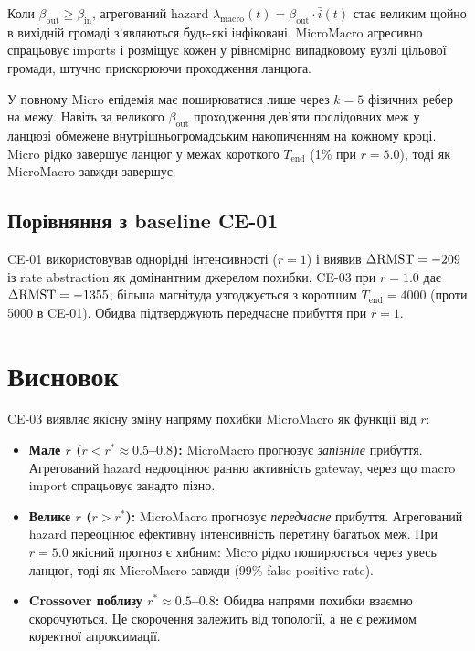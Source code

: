 \documentclass[11pt,a4paper]{article}
\begin{document}
Коли $\beta_{\text{out}} \ge \beta_{\text{in}}$, агрегований hazard
$\lambda_{\text{macro}}(t) = \beta_{\text{out}} \cdot \bar{i}(t)$ стає
великим щойно в вихідній громаді з'являються будь-які інфіковані.  MicroMacro
агресивно спрацьовує imports і розміщує кожен у рівномірно випадковому вузлі
цільової громади, штучно прискорюючи проходження ланцюга.

У повному Micro епідемія має поширюватися лише через $k=5$ фізичних ребер
на межу.  Навіть за великого $\beta_{\text{out}}$ проходження дев'яти
послідовних меж у ланцюзі обмежене внутрішньогромадським накопиченням
на кожному кроці.  Micro рідко завершує ланцюг у межах короткого $T_{\text{end}}$
(1\% при $r=5.0$), тоді як MicroMacro завжди завершує.

\subsection{Порівняння з baseline CE-01}

CE-01 використовував однорідні інтенсивності ($r=1$) і виявив $\Delta\mathrm{RMST} = -209$ із
rate abstraction як домінантним джерелом похибки.  CE-03 при $r=1.0$ дає
$\Delta\mathrm{RMST} = -1355$; більша магнітуда узгоджується з коротшим
$T_{\text{end}} = 4000$ (проти 5000 в CE-01).  Обидва підтверджують передчасне
прибуття при $r=1$.

\section{Висновок}

CE-03 виявляє якісну зміну напряму похибки MicroMacro як функції
від $r$:

\begin{itemize}
  \item \textbf{Мале $r$ ($r < r^* \approx 0.5$--$0.8$):}
        MicroMacro прогнозує \emph{запізніле} прибуття.  Агрегований hazard
        недооцінює ранню активність gateway, через що macro import спрацьовує занадто пізно.
  \item \textbf{Велике $r$ ($r > r^*$):}
        MicroMacro прогнозує \emph{передчасне} прибуття.  Агрегований hazard
        переоцінює ефективну інтенсивність перетину багатьох меж.
        При $r=5.0$ якісний прогноз є хибним: Micro рідко поширюється
        через увесь ланцюг, тоді як MicroMacro завжди (99\% false-positive rate).
  \item \textbf{Crossover поблизу $r^* \approx 0.5$--$0.8$:}
        Обидва напрями похибки взаємно скорочуються.  Це скорочення залежить від
        топології, а не є режимом коректної апроксимації.
\end{itemize}
\end{document}
